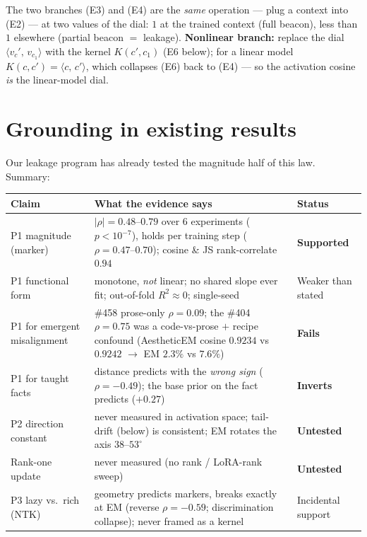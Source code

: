 \documentclass[11pt]{article}
\newcommand{\ip}[2]{\langle #1,\, #2\rangle}
\begin{document}
\noindent The two branches (E3) and (E4) are the \emph{same} operation --- plug a context
into (E2) --- at two values of the dial: $1$ at the trained context (full beacon), less
than $1$ elsewhere (partial beacon $=$ leakage). \textbf{Nonlinear branch:} replace the
dial $\ip{v_c'}{v_{c_1}}$ with the kernel $K(c',c_1)$ (E6 below); for a linear model
$K(c,c')=\ip{c}{c'}$, which collapses (E6) back to (E4) --- so the activation cosine
\emph{is} the linear-model dial.

\section*{Grounding in existing results}

Our leakage program has already tested the magnitude half of this law. Summary:

\begin{center}\small
\renewcommand{\arraystretch}{1.3}
\begin{tabular}{@{}p{} p{} p{}@{}}
\toprule
\textbf{Claim} & \textbf{What the evidence says} & \textbf{Status} \\
\midrule
P1 magnitude (marker) &
$|\rho|=0.48\text{–}0.79$ over 6 experiments ($p<10^{-7}$), holds per training step
($\rho=0.47\text{–}0.70$); cosine \& JS rank-correlate $0.94$ &
\textbf{Supported} \\
P1 functional form &
monotone, \emph{not} linear; no shared slope ever fit; out-of-fold $R^2\!\approx\!0$;
single-seed &
Weaker than stated \\
P1 for emergent misalignment &
\#458 prose-only $\rho=0.09$; the \#404 $\rho=0.75$ was a code-vs-prose $+$ recipe
confound (AestheticEM cosine $0.9234$ vs $0.9242$ $\to$ EM $2.3\%$ vs $7.6\%$) &
\textbf{Fails} \\
P1 for taught facts &
distance predicts with the \emph{wrong sign} ($\rho=-0.49$); the base prior on the fact
predicts ($+0.27$) &
\textbf{Inverts} \\
P2 direction constant &
never measured in activation space; tail-drift (below) is consistent; EM rotates the axis
$38\text{–}53^\circ$ &
\textbf{Untested} \\
Rank-one update &
never measured (no rank / LoRA-rank sweep) &
\textbf{Untested} \\
P3 lazy vs.\ rich (NTK) &
geometry predicts markers, breaks exactly at EM (reverse $\rho=-0.59$; discrimination
collapse); never framed as a kernel &
Incidental support \\
\bottomrule
\end{tabular}
\end{center}
\end{document}
